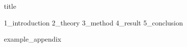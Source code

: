 \documentclass{article}
\begin{document}
{title}

\frontmatter

\begin{abstract}
    {0_abstract}
\end{abstract}
\clearpage


\tableofcontents

\listoffigures
\listoftables

\mainmatter


{1_introduction}
{2_theory}
{3_method}
{4_result}
{5_conclusion}

\newpage


\addappendix
{example_appendix}

\end{document}
